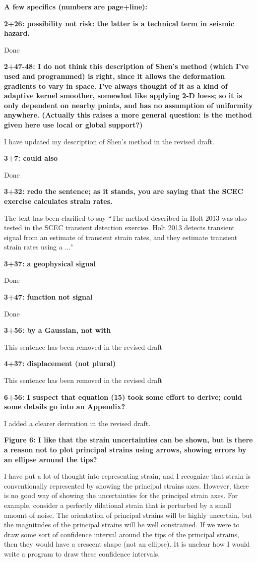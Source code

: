 \documentclass[10pt,a4paper]{letter}
\begin{document}
\begin{letter}{}
\textbf{A few specifics (numbers are page+line):}

\textbf{2+26: possibility not risk: the latter is a technical term in seismic
hazard.}

Done

\textbf{2+47-48: I do not think this description of Shen’s method (which I’ve
used and programmed) is right, since it allows the deformation
gradients to vary in space. I’ve always thought of it as a kind of
adaptive kernel smoother, somewhat like applying 2-D loess; so it is
only dependent on nearby points, and has no assumption of uniformity
anywhere. (Actually this raises a more general question: is the method
given here use local or global support?)}

I have updated my description of Shen's method in the revised draft.

\textbf{3+7: could also}

Done 

\textbf{3+32: redo the sentence; as it stands, you are saying that the SCEC
exercise calculates strain rates.}

The text has been clarified to say ``The method described in Holt 2013
was also tested in the SCEC transient detection exercise. Holt 2013
detects transient signal from an estimate of transient strain rates,
and they estimate transient strain rates using a ..."

\textbf{3+37: a geophysical signal}

Done

\textbf{3+47: function not signal}

Done

\textbf{3+56: by a Gaussian, not with}

This sentence has been removed in the revised draft

\textbf{4+37: displacement (not plural)}

This sentence has been removed in the revised draft

\textbf{6+56: I suspect that equation (15) took some effort to derive; could
some details go into an Appendix?}

I added a clearer derivation in the revised draft.

\textbf{Figure 6: I like that the strain uncertainties can be shown, but is
there a reason not to plot principal strains using arrows, showing
errors by an ellipse around the tips?}

I have put a lot of thought into representing strain, and I recognize
that strain is conventionally represented by showing the principal
strains axes. However, there is no good way of showing the
uncertainties for the principal strain axes. For example, consider a
perfectly dilational strain that is perturbed by a small amount of
noise. The orientation of principal strains will be highly uncertain,
but the magnitudes of the principal strains will be well constrained.
If we were to draw some sort of confidence interval around the tips of
the principal strains, then they would have a crescent shape (not an
ellipse). It is unclear how I would write a program to draw these
confidence intervals.


\end{letter}
\end{document}
